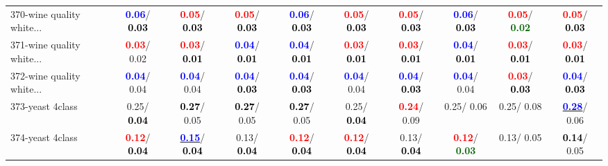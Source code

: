 \begin{table}[h]
\begin{center}
{\begin{tabular}{lc|c|c|c|c|c|c|c|c}
370-wine quality white... & \textcolor{blue}{\textbf{  0.06}}/\textcolor{black}{\textbf{  0.03}} & \textcolor{red}{\textbf{  0.05}}/\textcolor{black}{\textbf{  0.03}} & \textcolor{red}{\textbf{  0.05}}/\textcolor{black}{\textbf{  0.03}} & \textcolor{blue}{\textbf{  0.06}}/\textcolor{black}{\textbf{  0.03}} & \textcolor{red}{\textbf{  0.05}}/\textcolor{black}{\textbf{  0.03}} & \textcolor{red}{\textbf{  0.05}}/\textcolor{black}{\textbf{  0.03}} & \textcolor{blue}{\textbf{  0.06}}/\textcolor{black}{\textbf{  0.03}} & \textcolor{red}{\textbf{  0.05}}/\textcolor{darkgreen}{\textbf{  0.02}} & \textcolor{red}{\textbf{  0.05}}/\textcolor{black}{\textbf{  0.03}} \\
371-wine quality white... & \textcolor{red}{\textbf{  0.03}}/  0.02 & \textcolor{red}{\textbf{  0.03}}/\textcolor{black}{\textbf{  0.01}} & \textcolor{blue}{\textbf{  0.04}}/\textcolor{black}{\textbf{  0.01}} & \textcolor{blue}{\textbf{  0.04}}/\textcolor{black}{\textbf{  0.01}} & \textcolor{red}{\textbf{  0.03}}/\textcolor{black}{\textbf{  0.01}} & \textcolor{red}{\textbf{  0.03}}/\textcolor{black}{\textbf{  0.01}} & \textcolor{blue}{\textbf{  0.04}}/\textcolor{black}{\textbf{  0.01}} & \textcolor{red}{\textbf{  0.03}}/\textcolor{black}{\textbf{  0.01}} & \textcolor{red}{\textbf{  0.03}}/\textcolor{black}{\textbf{  0.01}} \\
372-wine quality white... & \textcolor{blue}{\textbf{  0.04}}/  0.04 & \textcolor{blue}{\textbf{  0.04}}/  0.04 & \textcolor{blue}{\textbf{  0.04}}/\textcolor{black}{\textbf{  0.03}} & \textcolor{blue}{\textbf{  0.04}}/\textcolor{black}{\textbf{  0.03}} & \textcolor{blue}{\textbf{  0.04}}/  0.04 & \textcolor{blue}{\textbf{  0.04}}/\textcolor{black}{\textbf{  0.03}} & \textcolor{blue}{\textbf{  0.04}}/  0.04 & \textcolor{red}{\textbf{  0.03}}/\textcolor{black}{\textbf{  0.03}} & \textcolor{blue}{\textbf{  0.04}}/\textcolor{black}{\textbf{  0.03}} \\
373-yeast 4class &   0.25/\textcolor{black}{\textbf{  0.04}} & \textcolor{black}{\textbf{  0.27}}/  0.05 & \textcolor{black}{\textbf{  0.27}}/  0.05 & \textcolor{black}{\textbf{  0.27}}/  0.05 &   0.25/\textcolor{black}{\textbf{  0.04}} & \textcolor{red}{\textbf{  0.24}}/  0.09 &   0.25/  0.06 &   0.25/  0.08 & \underline{\textcolor{blue}{\textbf{  0.28}}}/  0.06 \\ \hline
374-yeast 4class & \textcolor{red}{\textbf{  0.12}}/\textcolor{black}{\textbf{  0.04}} & \underline{\textcolor{blue}{\textbf{  0.15}}}/\textcolor{black}{\textbf{  0.04}} &   0.13/\textcolor{black}{\textbf{  0.04}} & \textcolor{red}{\textbf{  0.12}}/\textcolor{black}{\textbf{  0.04}} & \textcolor{red}{\textbf{  0.12}}/\textcolor{black}{\textbf{  0.04}} &   0.13/\textcolor{black}{\textbf{  0.04}} & \textcolor{red}{\textbf{  0.12}}/\textcolor{darkgreen}{\textbf{  0.03}} &   0.13/  0.05 & \textcolor{black}{\textbf{  0.14}}/  0.05 \\

\end{tabular}}
\end{center}
\end{table}
